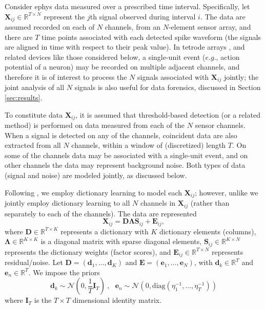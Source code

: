 \documentclass[journal]{IEEEtran}
\def\bf{\mathbf}
\newcommand{\beq}{\begin{equation}}
\newcommand{\eeq}{\end{equation}}
\newcommand{\Dmat}{{\bf D}}
\newcommand{\Emat}{{\bf E}}
\newcommand{\Imat}{{\bf I}}
\newcommand{\Smat}{{\bf S}}
\newcommand{\Xmat}{{\bf X}}
\newcommand{\dv}{\boldsymbol{d}}
\newcommand{\ev}{\boldsymbol{e}}
\newcommand{\Lambdamat}{\boldsymbol{\Lambda}}
\begin{document}
Consider ephys data measured over a prescribed time interval. Specifically, let $\Xmat_{ij}\in\mathbb{R}^{T\times N}$ represent the $j$th signal observed during interval $i$. The data are assumed recorded on each of $N$ channels, from an $N$-element sensor array, and there are $T$ time points associated with each detected spike waveform (the signals are aligned in time with respect to their peak value). In tetrode arrays \cite{tetrode}, and related devices like those considered below, a single-unit event ($e.g.$, action potential of a neuron) may be recorded on multiple adjacent channels, and therefore it is of interest to process the $N$ signals associated with $\Xmat_{ij}$ jointly; the joint analysis of all $N$ signals is also useful for data forensics, discussed in Section \ref{sec:results}.

To constitute data $\Xmat_{ij}$, it is assumed that threshold-based detection (or a related method) is performed on data measured from each of the $N$ sensor channels. When a signal is detected on any of the channels, coincident data are also extracted from all $N$ channels, within a window of (discretized) length $T$. On some of the channels data may be associated with a single-unit event, and on other channels the data may represent background noise. Both types of data (signal and noise) are modeled jointly, as discussed below.

Following \cite{Bo2011}, we employ dictionary learning to model each $\Xmat_{ij}$; however, unlike \cite{Bo2011} we jointly employ dictionary learning to all $N$ channels in $\Xmat_{ij}$ (rather than separately to each of the channels). The data are represented
\beq\Xmat_{ij}=\Dmat \Lambdamat \Smat_{ij}+\Emat_{ij},\label{eq:basic}\eeq
where $\Dmat\in\mathbb{R}^{T\times K}$ represents a dictionary with $K$ dictionary elements (columns), $\Lambdamat\in\mathbb{R}^{K\times K}$ is a diagonal matrix with sparse diagonal elements, $\Smat_{ij}\in\mathbb{R}^{K\times N}$ represents the dictionary weights (factor scores), and $\Emat_{ij}\in\mathbb{R}^{T\times N}$ represents residual/noise. Let $\Dmat=(\dv_1,\dots,\dv_K)$ and $\Emat=(\ev_1,\dots,\ev_N)$, with $\dv_k\in\mathbb{R}^T$ and $\ev_n\in\mathbb{R}^T$. We impose the priors
\beq \dv_k\sim\mathcal{N}(0,\frac{1}{T}\Imat_T)~,~~~ \ev_n\sim\mathcal{N}(0,\mbox{diag}(\eta_1^{-1},\dots,\eta_T^{-1}))\eeq
where $\Imat_T$ is the $T\times T$ dimensional identity matrix.
\end{document}
